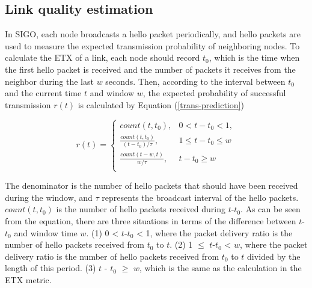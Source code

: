 \documentclass[conference]{IEEEtran}
\begin{document}


\subsection{Link quality estimation}

  In SIGO, each node broadcasts a hello packet periodically, and hello packets are used to measure the expected transmission probability of neighboring nodes. To calculate the ETX of a link, each node should record $t_{0}$, which is the time when the first hello packet is received and the number of packets it receives from the neighbor during the last $w$ seconds. Then, according to the interval between $t_{0}$ and the current time $t$ and window $w$, the expected probability of successful transmission $r(t)$ is calculated by Equation (\ref{trans-prediction})

\begin{equation}
\label{trans-prediction}
r(t) =\begin{cases}count(t, t_{0}), & 0 < t - t_{0} < 1,  \\ \frac{count(t,t_{0})}{(t-t_{0}) / \tau}, & 1 \leq t - t_{0} \leq w\\
\frac{count(t - w,t)}{w / \tau}, &  t - t_{0} \geq w\\
\end{cases}
\end{equation}

The denominator is the number of hello packets that should have been received during the window, and $\tau$ represents the broadcast interval of the hello packets. $count(t,t_{0})$ is the number of hello packets received during $t$-$t_{0}$.  
As can be seen from the equation, there are three situations in terms of the difference between $t$-$t_{0}$ and window time $w$. (1) 0 < $t$-$t_{0}$ < 1, where the packet delivery ratio is the number of hello packets received from $t_{0}$ to $t$. (2) 1 $\leq$ $t$-$t_{0}$ < $w$, where the packet delivery ratio is the number of hello packets received from $t_{0}$ to $t$ divided by the length of this period. (3) $t$ - $t_{0}$ $\geq$ $w$, which is the same as the calculation in the ETX metric.
\end{document}
